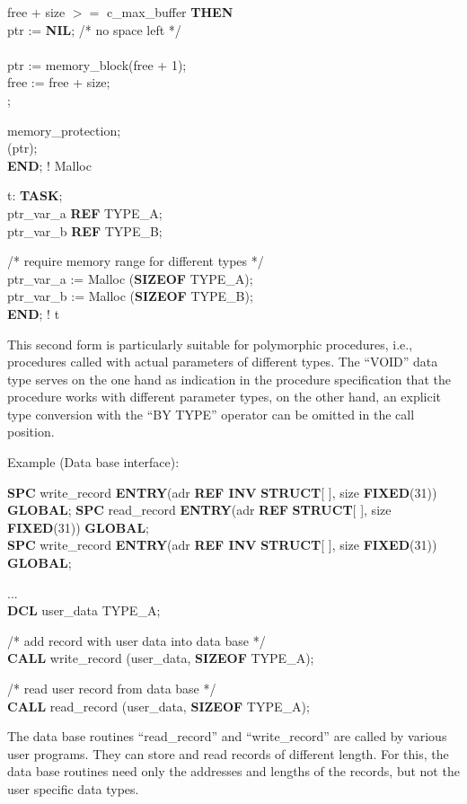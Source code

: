 \begin{removed}
 free + size $>=$ c\_max\_buffer {\bf THEN}\\
\x \x ptr := {\bf NIL}; \x /* no space left */\\
 \\
\x \x ptr := memory\_block(free + 1);\\
\x \x free := free + size;\\
;

 memory\_protection;\\
(ptr);\\
{\bf END}; ! Malloc

t: {\bf TASK};\\
 ptr\_var\_a {\bf REF} TYPE\_A;\\
 ptr\_var\_b {\bf REF} TYPE\_B;

\x /* require memory range for different types */\\
\x ptr\_var\_a := Malloc ({\bf SIZEOF} TYPE\_A);\\
\x ptr\_var\_b := Malloc ({\bf SIZEOF} TYPE\_B);\\
{\bf END}; ! t

\end{removed}
\begin{removed}
This second form is particularly suitable for polymorphic procedures,
i.e., procedures called with actual parameters of different types. The
``VOID'' data type serves on the one hand as indication in the procedure
specification that the procedure works with different parameter types,
on the other hand, an explicit type conversion with the ``BY TYPE''
operator can be omitted in the call position.

Example (Data base interface):

\begin{tabbing}
{\bf SPC} write\_record \= {\bf ENTRY}(adr {\bf REF INV} \= {\bf STRUCT}[ ], size {\bf FIXED}(31)) {\bf GLOBAL}; \kill
{\bf SPC} read\_record  \> {\bf ENTRY}(adr {\bf REF}     \> {\bf STRUCT}[ ], size {\bf FIXED}(31)) {\bf GLOBAL}; \\
{\bf SPC} write\_record \> {\bf ENTRY}(adr {\bf REF INV} \> {\bf STRUCT}[ ], size {\bf FIXED}(31)) {\bf GLOBAL};
\end{tabbing}

...\\
{\bf DCL} user\_data TYPE\_A;

/* add record with user data into data base */\\
{\bf CALL} write\_record (user\_data, {\bf SIZEOF} TYPE\_A);

/* read user record from data base */\\
{\bf CALL} read\_record (user\_data, {\bf SIZEOF} TYPE\_A);

The data base routines ``read\_record'' and ``write\_record'' are
called by various user programs. They can store and read records of
different length.  For this, the data base routines need only the
addresses and lengths of the records, but not the user specific data
types.
\end{removed}

